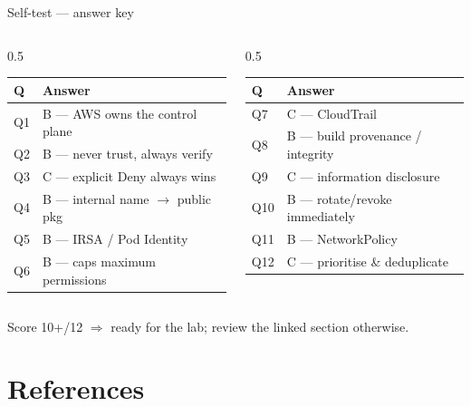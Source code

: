 \documentclass[aspectratio=169,10pt]{beamer}
\begin{document}
\begin{frame}{Self-test --- answer key}
  \small
  \begin{columns}[T]
    \begin{column}{0.5\textwidth}
      \begin{tabular}{ll}
        \toprule \textbf{Q} & \textbf{Answer}\\ \midrule
        Q1 & B --- AWS owns the control plane\\
        Q2 & B --- never trust, always verify\\
        Q3 & C --- explicit Deny always wins\\
        Q4 & B --- internal name $\to$ public pkg\\
        Q5 & B --- IRSA / Pod Identity\\
        Q6 & B --- caps maximum permissions\\
        \bottomrule
      \end{tabular}
    \end{column}
    \begin{column}{0.5\textwidth}
      \begin{tabular}{ll}
        \toprule \textbf{Q} & \textbf{Answer}\\ \midrule
        Q7  & C --- CloudTrail\\
        Q8  & B --- build provenance / integrity\\
        Q9  & C --- information disclosure\\
        Q10 & B --- rotate/revoke immediately\\
        Q11 & B --- NetworkPolicy\\
        Q12 & C --- prioritise \& deduplicate\\
        \bottomrule
      \end{tabular}
    \end{column}
  \end{columns}
  \vfill
  {\footnotesize\color{midgray}Score 10+/12 $\Rightarrow$ ready for the lab; review the linked section otherwise.}
\end{frame}

\section{References}
\end{document}
